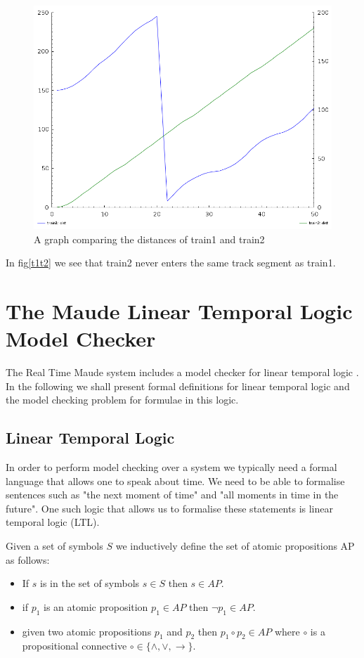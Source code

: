 \begin{figure}
\label{t1t2graph}
\begin{center}
\includegraphics[scale=0.4]{t1t2graph.png}
\end{center}
\caption{A graph comparing the distances of train1 and train2}
\end{figure}

In fig\ref{t1t2} we see that train2 never enters the same track segment as train1.

\section{The Maude Linear Temporal Logic Model Checker}
The Real Time Maude system includes a model checker for linear temporal logic \cite{ES00}. In the following we shall present formal definitions for linear temporal logic and the model checking problem for formulae in this logic.

\subsection{Linear Temporal Logic}
In order to perform model checking over a system we typically need a formal language that allows one to speak about time. We need to be able to formalise sentences such as "the next moment of time" and "all moments in time in the future". One such logic that allows us to formalise these statements is linear temporal logic (LTL)\cite{AP77}. 

\begin{mydef}
Given a set of symbols $S$ we inductively define the set of atomic propositions AP as follows:
\begin{itemize}
\item If $s$ is in the set of symbols $s \in S$ then $s \in AP$.

\item if $p_1$ is an atomic proposition $p_1 \in AP$ then $\neg p_1 \in AP$.

\item given two atomic propositions $p_1$ and $p_2$ then $p_1 \circ p_2 \in AP$ where $\circ$ is a propositional connective $\circ \in \{ \wedge,\vee,\to \} $.
\end{itemize} 
\end{mydef}

